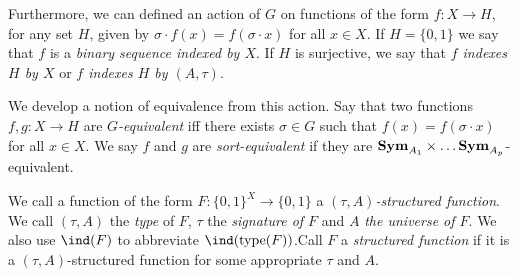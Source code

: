 \documentclass[../paper.tex]{subfiles}
\begin{document}
Furthermore, we can defined an action of $G$ on functions of the form $f: X
\rightarrow H$, for any set $H$, given by $\sigma \cdot f(x) = f(\sigma \cdot
x)$ for all $x \in X$. If $H = \{0,1\}$ we say that $f$ is a \emph{binary
  sequence indexed by $X$}. If $H$ is surjective, we say that \emph{$f$ indexes
  $H$ by $X$} or \emph{$f$ indexes $H$ by $(A,\tau)$}.

We develop a notion of equivalence from this action. Say that two functions $f,
g : X \rightarrow H$ are \emph{$G$-equivalent} iff there exists $\sigma \in G$
such that $f(x) = f(\sigma \cdot x)$ for all $x \in X$. We say $f$ and $g$ are
\emph{sort-equivalent} if they are $\text{\textbf{Sym}}_{A_1} \times \ldots
\text{\textbf{Sym}}_{A_p}$-equivalent.

We call a function of the form $F:\{0,1\}^{X} \rightarrow \{0,1\}$ a
\emph{$(\tau, A)$-structured function}. We call $(\tau, A)$ the \emph{type} of
$F$, $\tau$ the \emph{signature of $F$} and $A$ \emph{the universe of $F$}. We
also use $\ind(F)$ to abbreviate $\ind (\type (F))$.Call $F$ a \emph{structured
  function} if it is a $(\tau, A)$-structured function for some appropriate
$\tau$ and $A$.



\end{document}
